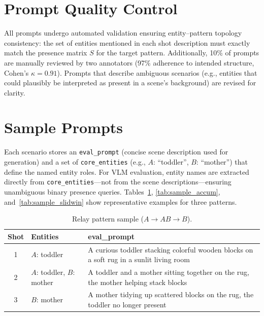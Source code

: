 \documentclass[sigconf,review,anonymous]{acmart}
\begin{document}
\section{Prompt Quality Control}
\label{app:quality_control}

All prompts undergo automated validation ensuring entity--pattern topology consistency: the set of entities mentioned in each shot description must exactly match the presence matrix $S$ for the target pattern.
Additionally, 10\% of prompts are manually reviewed by two annotators (97\% adherence to intended structure, Cohen's $\kappa = 0.91$).
Prompts that describe ambiguous scenarios (e.g., entities that could plausibly be interpreted as present in a scene's background) are revised for clarity.


\section{Sample Prompts}
\label{app:prompts}

Each scenario stores an \texttt{eval\_prompt} (concise scene description used for generation) and a set of \texttt{core\_entities} (e.g., $A$: ``toddler'', $B$: ``mother'') that define the named entity roles. For VLM evaluation, entity names are extracted directly from \texttt{core\_entities}---not from the scene descriptions---ensuring unambiguous binary presence queries. Tables~\ref{tab:sample_relay}, \ref{tab:sample_accum}, and~\ref{tab:sample_slidwin} show representative examples for three patterns.
\begin{table}[H]
\caption{Relay pattern sample ($A \to AB \to B$).}
\label{tab:sample_relay}
\centering
\small
\setlength{\tabcolsep}{3pt}
\begin{tabular}{@{}clp{5.2cm}@{}}
\toprule
Shot & Entities & eval\_prompt \\
\midrule
1 & $A$: toddler & A curious toddler stacking colorful wooden blocks on a soft rug in a sunlit living room \\
2 & $A$: toddler, $B$: mother & A toddler and a mother sitting together on the rug, the mother helping stack blocks \\
3 & $B$: mother & A mother tidying up scattered blocks on the rug, the toddler no longer present \\
\bottomrule
\end{tabular}
\end{table}
\end{document}
